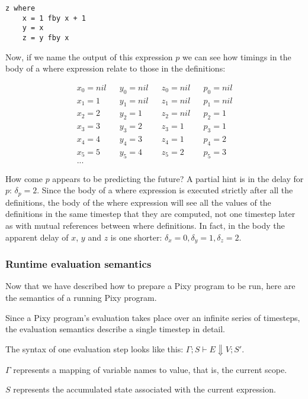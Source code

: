 \documentclass{scrartcl}
\begin{document}
    \begin{lstlisting}
z where
    x = 1 fby x + 1
    y = x
    z = y fby x
    \end{lstlisting}
    
    Now, if we name the output of this expression $p$ we can see how timings in the body of a where expression relate to those in the definitions:
    
    \begin{align*}
    x_0 = nil && y_0 = nil && z_0 = nil && p_0 = nil \\
    x_1 = 1 && y_1 = nil && z_1 = nil && p_1 = nil \\
    x_2 = 2 && y_2 = 1 && z_2 = nil && p_2 = 1 \\
    x_3 = 3 && y_3 = 2 && z_3 = 1 && p_3 = 1 \\
    x_4 = 4 && y_4 = 3 && z_4 = 1 && p_4 = 2\\
    x_5 = 5 && y_5 = 4 && z_5 = 2 && p_5 = 3\\
    ...
    \end{align*}
    
    How come $p$ appears to be predicting the future? A partial hint is in the delay for $p$: $\delta_p = 2$. Since the body of a where expression is executed strictly after all the definitions, the body of the where expression will see all the values of the definitions in the same timestep that they are computed, not one timestep later as with mutual references between where definitions. In fact, in the body the apparent delay of $x$, $y$ and $z$ is one shorter: $\delta_x = 0, \delta_y = 1, \delta_z = 2$.
    
    \subsubsection{Runtime evaluation semantics}
    
    Now that we have described how to prepare a Pixy program to be run, here are the semantics of a running Pixy program.
    
    Since a Pixy program's evaluation takes place over an infinite series of timesteps, the evaluation semantics describe a single timestep in detail.
    
    The syntax of one evaluation step looks like this: $\Gamma; S \vdash E \Downarrow V; S'$.
    
    $\Gamma$ represents a mapping of variable names to value, that is, the current scope.
    
    $S$ represents the accumulated state associated with the current expression.
    
\end{document}
